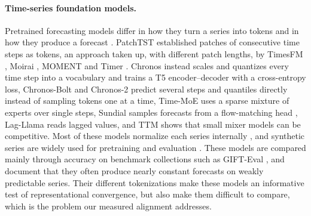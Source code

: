 \documentclass[twoside,11pt]{article}
\begin{document}
\paragraph{Time-series foundation models.}
Pretrained forecasting models differ in how they turn a series into tokens and in how they produce a forecast \citep{liang2024foundation}.
PatchTST \citep{nie2023patchtst} established patches of consecutive time steps as tokens, an approach taken up, with different patch lengths, by TimesFM \citep{das2024timesfm}, Moirai \citep{woo2024moirai}, MOMENT \citep{goswami2024moment} and Timer \citep{liu2024timer}.
Chronos \citep{ansari2024chronos} instead scales and quantizes every time step into a vocabulary and trains a T5 encoder--decoder \citep{raffel2020t5} with a cross-entropy loss, Chronos-Bolt and Chronos-2 \citep{ansari2025chronos2} predict several steps and quantiles directly instead of sampling tokens one at a time, Time-MoE \citep{shi2025timemoe} uses a sparse mixture of experts over single steps, Sundial \citep{liu2025sundial} samples forecasts from a flow-matching head \citep{lipman2023flow}, Lag-Llama \citep{rasul2023lagllama} reads lagged values, and TTM \citep{ekambaram2024ttm} shows that small mixer models can be competitive.
Most of these models normalize each series internally \citep{kim2022revin}, and synthetic series are widely used for pretraining and evaluation \citep{kang2020gratis,dooley2023forecastpfn}.
These models are compared mainly through accuracy on benchmark collections such as GIFT-Eval \citep{aksu2024gifteval}, and \citet{wan2026collapse} document that they often produce nearly constant forecasts on weakly predictable series.
Their different tokenizations make these models an informative test of representational convergence, but also make them difficult to compare, which is the problem our measured alignment addresses.
\end{document}
